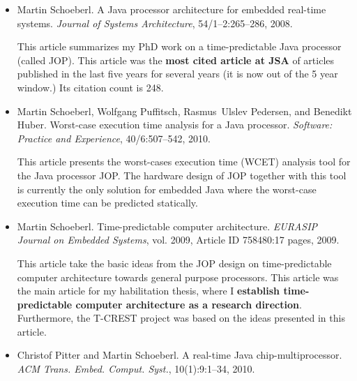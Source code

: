 \documentclass[%
    a4paper,
    11pt, %
    headinclude, footexclude,
    notitlepage,
    headsepline,
    pointlessnumbers,
    ]{scrartcl}
\begin{document}
\begin{itemize}

\item Martin Schoeberl. A Java processor architecture for
embedded real-time systems. {\em Journal of Systems
Architecture}, 54/1--2:265--286, 2008.

This article summarizes my PhD work on a time-predictable Java processor
(called JOP). This article was the \textbf{most cited article at JSA} of articles
published in the last five years for several years (it is now out of the 5 year
window.) Its citation count is 248.

\item Martin Schoeberl, Wolfgang Puffitsch, Rasmus~Ulslev
    Pedersen, and Benedikt Huber. Worst-case execution time
  analysis for a {Java} processor. {\em Software: Practice and
  Experience}, 40/6:507--542, 2010.
  
This article presents the worst-cases execution time (WCET) analysis tool for
the Java processor JOP.
The hardware design of JOP together with this tool is currently the only
solution for embedded Java where the worst-case execution time can
be predicted statically.

\item Martin Schoeberl. Time-predictable computer architecture.
    {\em EURASIP Journal on Embedded Systems}, vol. 2009, Article
    ID 758480:17 pages, 2009.
    
This article take the basic ideas from the JOP design on time-predictable
computer architecture towards general purpose processors. This article was
the main article for my habilitation thesis, where I {\bf establish time-predictable
computer architecture as a research direction}.
Furthermore, the T-CREST project was based on the ideas presented in this article.
   
%

\item Christof Pitter and Martin Schoeberl.
A real-time {Java} chip-multiprocessor.
{\em ACM Trans. Embed. Comput. Syst.}, 10(1):9:1--34, 2010.


\end{itemize}
\end{document}
